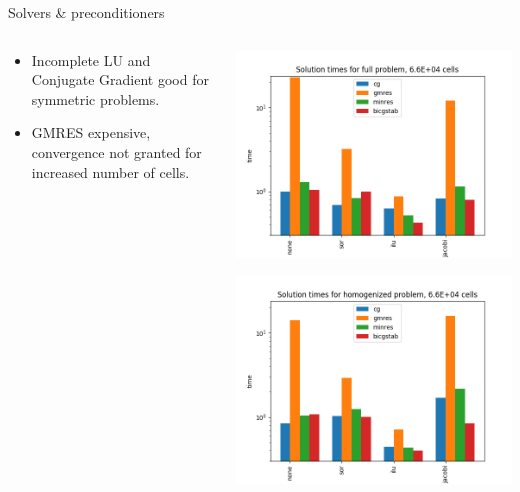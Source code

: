 \documentclass{beamer}
\begin{document}
\begin{frame}[t]{Solvers \& preconditioners}
  \begin{columns}
    \begin{column}[c]{.5\textwidth}
      \begin{itemize}
      \item Incomplete LU and Conjugate Gradient good for symmetric problems.
      \item GMRES expensive, convergence not granted for increased number of cells.
    \end{itemize}
  \end{column}
  \begin{column}[c]{.5\textwidth}
    
    \includegraphics[width=0.9\linewidth]{SolverTimesFullh8.png}

    \includegraphics[width=0.9\linewidth]{SolverTimesHomoh8.png}
    
 \end{column}
\end{columns}
\end{frame}
\end{document}

